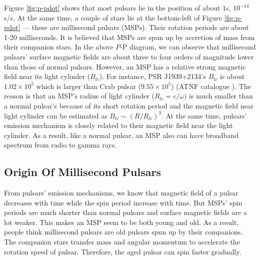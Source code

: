 \documentclass[12pt]{report}
\begin{document}
      Figure \ref{fig:p-pdot} shows that most pulsars lie in the position of about 
      $1$s, $10^{-14}$s/s. At the same time, a couple of stars lie at the bottom-left 
      of Figure \ref{fig:p-pdot} --- these are millisecond pulsars (MSPs). Their 
      rotation periods are about 1-20 milliseconds. It is believed that MSPs are spun 
      up by accretion of mass from their companion stars. In the above 
      $P$-$\dot{\mbox{P}}$ diagram, we can observe that millisecond pulsars' 
      surface magnetic fields are about three to four orders of magnitude lower than those
      of normal pulsars. However, an MSP has a relative strong magnetic field near its 
      light cylinder ($B_{lc}$). For instance, PSR J1939+2134's $B_{lc}$ is about 
      $1.02\times10^5$ which is larger than Crab pulsar ($9.55\times10^5$) (ATNF catalogue 
      \cite{ATNF}).
      The reason is that an MSP's radius 
      of light cylinder ($R_{lc}=c/\omega)$ is much smaller than a normal pulsar's 
      because of its short rotation period and the magnetic field near light cylinder can
      be estimated as $B_{lc}\sim\left(R/R_{lc}\right)^3$. At the same time, 
      pulsars' emission mechanism is closely related to their magnetic field near the light 
      cylinder. As a result, like a normal pulsar, an MSP also can have broadband spectrum 
      from radio to gamma rays. 
    \subsection{Origin Of Millisecond Pulsars}
      From pulsars' emission mechanisms, we know that magnetic field of a pulsar 
      decreases with time while the spin period increase with time. But MSPs' spin 
      periods are much shorter than normal pulsars and surface magnetic fields are a 
      lot weaker. This makes an MSP seem to be both young and old. As a result,
      people think millisecond pulsars are old pulsars spun up by their companions. 
      The companion stars transfer mass and angular momentum to accelerate the rotation
      speed of pulsar. Therefore, the aged pulsar can spin faster gradually. 
\end{document}
